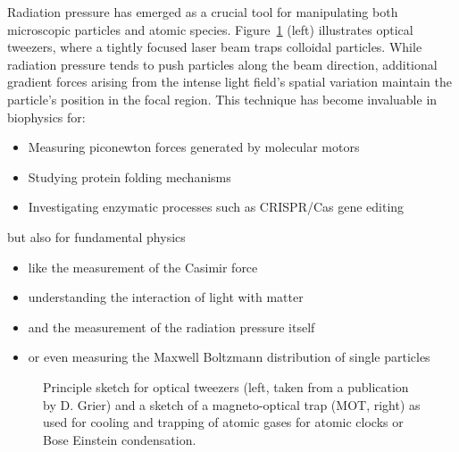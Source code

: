\documentclass[
  a4paper,
]{book}
\providecommand{\tightlist}{%
  \setlength{\itemsep}{0pt}\setlength{\parskip}{0pt}}
\begin{document}
Radiation pressure has emerged as a crucial tool for manipulating both
microscopic particles and atomic species. Figure~\ref{fig-traps} (left)
illustrates optical tweezers, where a tightly focused laser beam traps
colloidal particles. While radiation pressure tends to push particles
along the beam direction, additional gradient forces arising from the
intense light field's spatial variation maintain the particle's position
in the focal region. This technique has become invaluable in biophysics
for:

\begin{itemize}
\tightlist
\item
  Measuring piconewton forces generated by molecular motors
\item
  Studying protein folding mechanisms
\item
  Investigating enzymatic processes such as CRISPR/Cas gene editing
\end{itemize}

but also for fundamental physics

\begin{itemize}
\tightlist
\item
  like the measurement of the Casimir force
\item
  understanding the interaction of light with matter
\item
  and the measurement of the radiation pressure itself
\item
  or even measuring the Maxwell Boltzmann distribution of single
  particles
\end{itemize}

\begin{figure}


\caption{\label{fig-traps}Principle sketch for optical tweezers (left,
taken from a publication by D. Grier) and a sketch of a magneto-optical
trap (MOT, right) as used for cooling and trapping of atomic gases for
atomic clocks or Bose Einstein condensation.}

\end{figure}%
\end{document}
